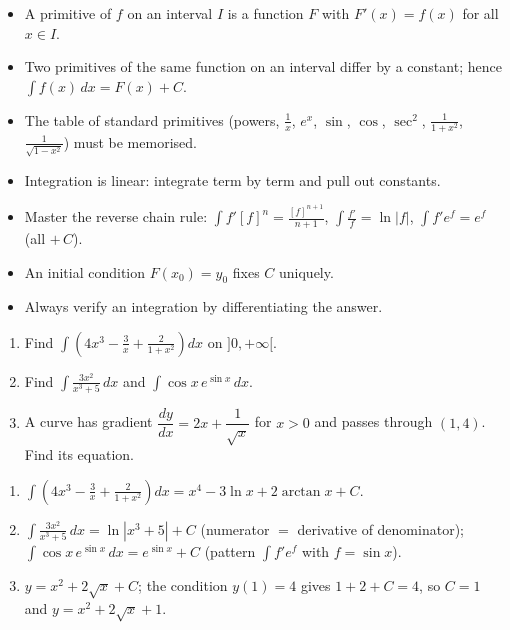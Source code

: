 \documentclass[11pt]{article}
\newcommand{\cle}[1]{{\popxbold\color{popdark}#1}}
\begin{document}
\begin{aretenir}
\begin{itemize}
\item A \cle{primitive} of $f$ on an interval $I$ is a function $F$ with $F'(x) = f(x)$ for all $x \in I$.
\item Two primitives of the same function on an interval differ by a \cle{constant}; hence $\displaystyle \int f(x)\,dx = F(x) + C$.
\item The table of standard primitives (powers, $\tfrac1x$, $e^x$, $\sin$, $\cos$, $\sec^2$, $\tfrac{1}{1+x^2}$, $\tfrac{1}{\sqrt{1-x^2}}$) must be memorised.
\item Integration is \cle{linear}: integrate term by term and pull out constants.
\item Master the reverse chain rule: $\int f'[f]^n = \frac{[f]^{n+1}}{n+1}$, $\int \frac{f'}{f} = \ln|f|$, $\int f'e^{f} = e^{f}$ (all $+\,C$).
\item An initial condition $F(x_0) = y_0$ fixes $C$ uniquely.
\item Always \cle{verify} an integration by differentiating the answer.
\end{itemize}
\end{aretenir}

\begin{exercice}[Practice]
\begin{enumerate}
\item Find $\displaystyle \int\left(4x^3 - \frac{3}{x} + \frac{2}{1+x^2}\right)dx$ on $]0,+\infty[$.
\item Find $\displaystyle \int \frac{3x^2}{x^3+5}\,dx$ and $\displaystyle \int \cos x\, e^{\sin x}\,dx$.
\item A curve has gradient $\dfrac{dy}{dx} = 2x + \dfrac{1}{\sqrt{x}}$ for $x>0$ and passes through $(1, 4)$. Find its equation.
\end{enumerate}
\end{exercice}

\begin{corrige}[Exercise 1]
\begin{enumerate}
\item $\displaystyle \int\left(4x^3 - \frac{3}{x} + \frac{2}{1+x^2}\right)dx = x^4 - 3\ln x + 2\arctan x + C$.
\item $\displaystyle \int \frac{3x^2}{x^3+5}\,dx = \ln|x^3+5| + C$ (numerator $=$ derivative of denominator); $\displaystyle \int \cos x\, e^{\sin x}\,dx = e^{\sin x} + C$ (pattern $\int f'e^f$ with $f = \sin x$).
\item $y = x^2 + 2\sqrt{x} + C$; the condition $y(1) = 4$ gives $1 + 2 + C = 4$, so $C = 1$ and $y = x^2 + 2\sqrt{x} + 1$.
\end{enumerate}
\end{corrige}
\end{document}
